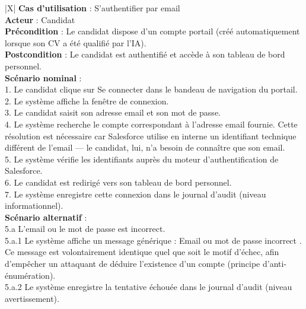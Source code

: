 \begin{xltabular}{\linewidth}{|X|}
    \hline
    \textbf{Cas d'utilisation} : S'authentifier par email \\
    \hline
    \textbf{Acteur} : Candidat \\
    \hline
    \textbf{Précondition} : Le candidat dispose d'un compte portail (créé automatiquement lorsque son CV a été qualifié par l'IA). \\
    \hline
    \textbf{Postcondition} : Le candidat est authentifié et accède à son tableau de bord personnel. \\
    \hline
    \textbf{Scénario nominal} : \\
    1. Le candidat clique sur \og Se connecter \fg dans le bandeau de navigation du portail. \\
    2. Le système affiche la fenêtre de connexion. \\
    3. Le candidat saisit son adresse email et son mot de passe. \\
    4. Le système recherche le compte correspondant à l'adresse email fournie. Cette résolution est nécessaire car Salesforce utilise en interne un identifiant technique différent de l'email --- le candidat, lui, n'a besoin de connaître que son email. \\
    5. Le système vérifie les identifiants auprès du moteur d'authentification de Salesforce. \\
    6. Le candidat est redirigé vers son tableau de bord personnel. \\
    7. Le système enregistre cette connexion dans le journal d'audit (niveau informationnel). \\
    \hline
    \textbf{Scénario alternatif} : \\
    5.a L'email ou le mot de passe est incorrect. \\
    \hspace{0.5cm} 5.a.1 Le système affiche un message générique : \og Email ou mot de passe incorrect \fg. Ce message est volontairement identique quel que soit le motif d'échec, afin d'empêcher un attaquant de déduire l'existence d'un compte (principe d'anti-énumération). \\
    \hspace{0.5cm} 5.a.2 Le système enregistre la tentative échouée dans le journal d'audit (niveau avertissement). \\
    \hline
\caption{Description textuelle du CU « S'authentifier par email »}
\label{tab:cu_authentifier}
\end{xltabular}

